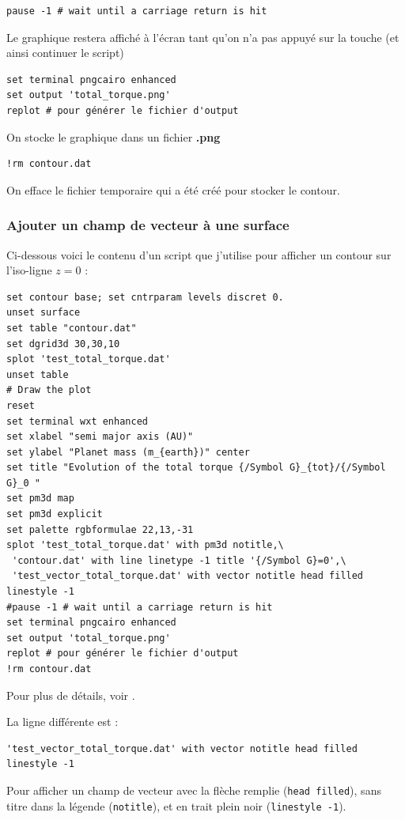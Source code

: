 \documentclass[a4paper,twoside]{article}
\begin{document}
\begin{verbatim}
pause -1 # wait until a carriage return is hit
\end{verbatim}
Le graphique restera affiché à l'écran tant qu'on n'a pas appuyé sur la touche  (et ainsi continuer le script)

\begin{verbatim}
set terminal pngcairo enhanced
set output 'total_torque.png'
replot # pour générer le fichier d'output
\end{verbatim}
On stocke le graphique dans un fichier \textbf{.png}

\begin{verbatim}
!rm contour.dat
\end{verbatim}
On efface le fichier temporaire qui a été créé pour stocker le contour.

\subsubsection{Ajouter un champ de vecteur à une surface}
Ci-dessous voici le contenu d'un script que j'utilise pour afficher un contour sur l'iso-ligne $z=0$ : 
\begin{verbatim}
set contour base; set cntrparam levels discret 0.
unset surface
set table "contour.dat"
set dgrid3d 30,30,10
splot 'test_total_torque.dat'
unset table
# Draw the plot
reset
set terminal wxt enhanced
set xlabel "semi major axis (AU)"
set ylabel "Planet mass (m_{earth})" center
set title "Evolution of the total torque {/Symbol G}_{tot}/{/Symbol G}_0 "
set pm3d map
set pm3d explicit
set palette rgbformulae 22,13,-31
splot 'test_total_torque.dat' with pm3d notitle,\
 'contour.dat' with line linetype -1 title '{/Symbol G}=0',\
 'test_vector_total_torque.dat' with vector notitle head filled linestyle -1
#pause -1 # wait until a carriage return is hit
set terminal pngcairo enhanced
set output 'total_torque.png'
replot # pour générer le fichier d'output
!rm contour.dat
\end{verbatim}
Pour plus de détails, voir . 

La ligne différente est :
\begin{verbatim}
'test_vector_total_torque.dat' with vector notitle head filled linestyle -1
\end{verbatim}
Pour afficher un champ de vecteur avec la flèche remplie (\texttt{head filled}), sans titre dans la légende (\texttt{notitle}), et en trait plein noir (\texttt{linestyle -1}).
\end{document}
